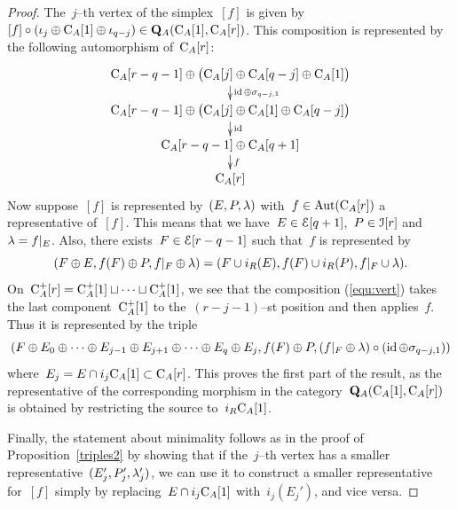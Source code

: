 \begin{proof}
The~$j$--th vertex of the simplex~$[f]$ is given by~\hbox{$[f]\circ (\iota_{j}\oplus \mathrm{C}_A[1]\oplus \iota_{q-j})\in \mathbf{Q}_A(\mathrm{C}_A[1],\mathrm{C}_A[r])$}. This composition is represented by the following automorphism of~$\mathrm{C}_A[r]$: 
\begin{equation}\label{equ:vert}
\xymatrix@R=11pt{
\rmC_A[r-q-1]\oplus \big(\rmC_A[j]\oplus \rmC_A[q-j]\oplus\rmC_A[1]\big)\ar[d]^{\id\oplus\s_{q-j,1}}\\
\rmC_A[r-q-1]\oplus \big(\rmC_A[j]\oplus \rmC_A[1]\oplus \rmC_A[q-j]\big)\ar[d]^\id\\
\rmC_A[r-q-1]\oplus \rmC_A[q+1]\ar[d]^f\\
\rmC_A[r]
}
\end{equation}
Now suppose~$[f]$ is represented by~$(E,P,\lambda)$ with~$f\in \operatorname{Aut}(\mathrm{C}_A[r])$ a representative of~$[f]$. This means that we have~\hbox{$E\in \mathcal{E}[q+1]$},~$P\in \mathcal{I}[r]$ and~\hbox{$\lambda=f|_{E}$}. Also, there exists~$F\in\mathcal{E}[r-q-1]$ such that~$f$ is represented by 
$$(F\oplus E,f(F)\oplus P,f|_F\oplus \lambda)=(F\cup i_R(E),f(F)\cup i_R(P),f|_F\cup\lambda).$$ 
On~$\mathrm{C}_A^+[r]=\mathrm{C}_A^+[1]\sqcup\dots\sqcup\mathrm{C}_A^+[1]$, we see that the composition (\ref{equ:vert}) takes the last component~$\mathrm{C}_A^+[1]$ to the~\hbox{$(r-j-1)$}--st position and then applies~$f$.  Thus it is represented by   the triple 
\[
(F\oplus E_0\oplus\dots\oplus E_{j-1}\oplus E_{j+1}\oplus\dots\oplus E_q\oplus E_j,f(F)\oplus P,(f|_F\oplus\lambda)\circ (\operatorname{id}\oplus \sigma_{q-j,1}))
\]
where~\hbox{$E_j=E\cap i_j\mathrm{C}_A[1]\subset\mathrm{C}_A[r]$}. 
This proves the first part of the result, as the representative of the corresponding morphism in the category~$\mathbf{Q}_A(\mathrm{C}_A[1],\mathrm{C}_A[r])$ is obtained by restricting the source to~$i_R\mathrm{C}_A[1]$. 

Finally, the statement about minimality follows as in the proof of Proposition~\ref{triples2} by showing that if the~$j$--th vertex has a smaller representative~$(E_j',P_j',\lambda_j')$, we can use it to construct a smaller representative for~$[f]$ simply by replacing~$E\cap i_j\mathrm{C}_A[1]$ with~$i_j(E_j')$, and vice versa. 
\end{proof}

